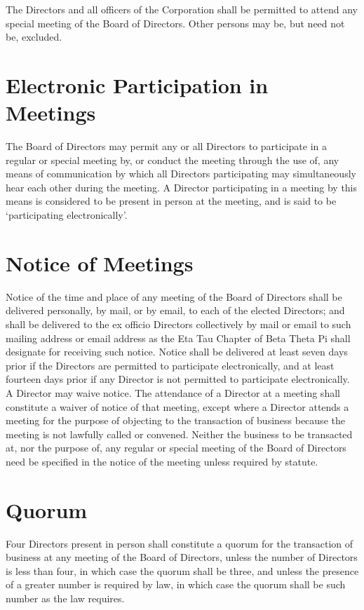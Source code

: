 The Directors and all officers of the Corporation shall be permitted to attend
any special meeting of the Board of Directors.  Other persons may be, but need
not be, excluded.

\section{Electronic Participation in Meetings}

The Board of Directors may permit any or all Directors to participate in a
regular or special meeting by, or conduct the meeting through the use of, any
means of communication by which all Directors participating may simultaneously
hear each other during the meeting. A Director participating in a meeting by
this means is considered to be present in person at the meeting, and is said to
be `participating electronically'.


\section{Notice of Meetings}

Notice of the time and place of any meeting of the Board of Directors shall be
delivered personally, by mail, or by email, to each of the elected Directors;
and shall be delivered to the ex officio Directors collectively by mail or email
to such mailing address or email address as the Eta Tau Chapter of Beta Theta Pi
shall designate for receiving such notice. Notice shall be delivered at least
seven days prior if the Directors are permitted to participate electronically,
and at least fourteen days prior if any Director is not permitted to participate
electronically. A Director may waive notice. The attendance of a Director at a
meeting shall constitute a waiver of notice of that meeting, except where a
Director attends a meeting for the purpose of objecting to the transaction of
business because the meeting is not lawfully called or convened. Neither the
business to be transacted at, nor the purpose of, any regular or special meeting
of the Board of Directors need be specified in the notice of the meeting unless
required by statute.

\section{Quorum}

Four Directors present in person shall constitute a quorum for the transaction
of business at any meeting of the Board of Directors, unless the number of
Directors is less than four, in which case the quorum shall be three, and unless
the presence of a greater number is required by law, in which case the quorum
shall be such number as the law requires.

